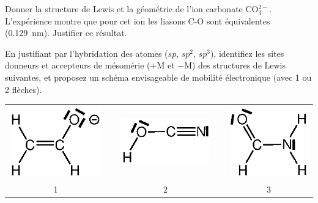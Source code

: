 

Donner la structure de Lewis et la g\'eom\'etrie de l'ion carbonate CO$_3^{2-}$. 
L'exp\'erience montre que pour cet ion les liasons C-O sont \'equivalentes (0.129~nm).
Justifier ce r\'esultat.


En justifiant par l'hybridation des atomes ($sp$, $sp^2$, $sp^3$), identifiez les sites donneurs et 
accepteurs de m\'esom\'erie (+M et $-$M) des structures de Lewis suivantes, et proposez un sch\'ema 
envisageable de mobilit\'e \'electronique (avec 1 ou 2 fl\`eches).

\begin{center}
\begin{tabular}{ccccc}
\includegraphics[scale=0.7]{figure/meso1.eps} & \, & \includegraphics[scale=0.7]{figure/meso2.eps} & \, &\includegraphics[scale=0.7]{figure/meso3.eps} \\
1& &2& &3\\[0.2cm]

\end{tabular}
\end{center}
